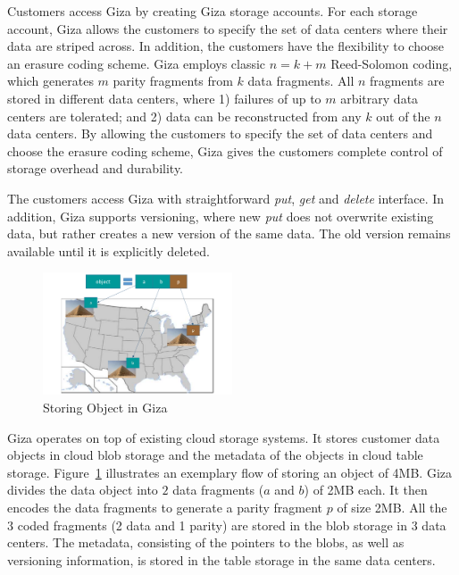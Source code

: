 Customers access Giza by creating Giza storage accounts. For each storage account, Giza allows the customers to specify the set of data centers where their data are striped across. In addition, the customers have the flexibility to choose an erasure coding scheme. Giza employs classic $n = k + m$ Reed-Solomon coding, which generates $m$ parity fragments from $k$ data fragments. All $n$ fragments are stored in different data centers, where 1) failures of up to $m$ arbitrary data centers are tolerated; and 2) data can be reconstructed from any $k$ out of the $n$ data centers. By allowing the customers to specify the set of data centers and choose the erasure coding scheme, Giza gives the customers complete control of storage overhead and durability.

The customers access Giza with straightforward {\em put}, {\em get} and {\em delete} interface. In addition, Giza supports versioning, where new {\em put} does not overwrite existing data, but rather creates a new version of the same data. The old version remains available until it is explicitly deleted.

\begin{figure}[tp]
\centering
\includegraphics[width=0.5\textwidth]{images/giza_example_crop_fit}
\caption{Storing Object in Giza}
\label{fig:giza_example}
\end{figure}

Giza operates on top of existing cloud storage systems. It stores customer data objects in cloud blob storage and the metadata of the objects in cloud table storage.
Figure~\ref{fig:giza_example} illustrates an exemplary flow of storing an object of 4MB.
Giza divides the data object into $2$ data fragments ($a$ and $b$) of 2MB each. It then encodes the data fragments to generate a parity fragment $p$ of size 2MB. All the $3$ coded fragments (2 data and 1 parity) are stored in the blob storage in 3 data centers. The metadata, consisting of the pointers to the blobs, as well as versioning information, is stored in the table storage in the same data centers.

